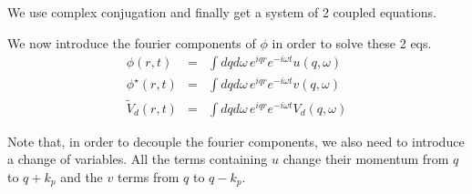 \documentclass[a4paper,prb,10pt,aps,twocolumn]{revtex4-1}
\begin{document}
We use complex conjugation and finally get a system of 2 coupled
equations.



We now introduce the fourier components of $\phi$ in order to
solve these 2 eqs.
\begin{subequations}
  \begin{eqnarray}
    \label{eq:106}
   \phi(r,t)&=&\int dqd\omega\, e^{iqr}e^{-i\omega t}u(q,\omega)\\   
   \phi^{\star}(r,t)&=&\int dqd\omega\, e^{iqr}e^{-i\omega t}v(q,\omega)\\
   \tilde{V}_{d}(r,t)&=&\int dqd\omega\, e^{iqr}e^{-i\omega t}{V}_{d}(q,\omega)
  \end{eqnarray}
\end{subequations}

Note that, in order to decouple the fourier components, we also need to
introduce a change of variables. All the terms containing 
$u$
change their momentum from $q$ to $q+k_p$ and the $v$
terms from $q$ to $q-k_p$.
\end{document}
